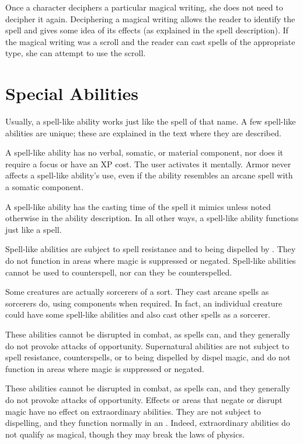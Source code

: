 Once a character deciphers a particular magical writing, she does not need to decipher it again. Deciphering a magical writing allows the reader to identify the spell and gives some idea of its effects (as explained in the spell description). If the magical writing was a scroll and the reader can cast spells of the appropriate type, she can attempt to use
the scroll.

\section{Special Abilities }

 Usually, a spell-like ability works just like the spell of that name. A few spell-like abilities are unique; these are explained in the text where they are described.

A spell-like ability has no verbal, somatic, or material component, nor does it require a focus or have an XP cost. The user activates it mentally. Armor never affects a spell-like ability's use, even if the ability resembles an arcane spell with a somatic component.

A spell-like ability has the casting time of the spell it mimics unless noted otherwise in the ability description. In all other ways, a spell-like ability functions just like a spell.

Spell-like abilities are subject to spell resistance and to being dispelled by . They do not function in areas where magic is suppressed or negated. Spell-like abilities cannot be used to counterspell, nor can they be counterspelled.

Some creatures are actually sorcerers of a sort. They cast arcane spells as sorcerers do, using components when required. In fact, an individual creature could have some spell-like abilities and also cast other spells as a sorcerer.

 These abilities cannot be disrupted in combat, as spells can, and they generally do not provoke attacks of opportunity. Supernatural abilities are not subject to spell resistance, counterspells, or to being dispelled by dispel magic, and do not function in areas where magic is suppressed or negated.

 These abilities cannot be disrupted in combat, as spells can, and they generally do not provoke attacks of opportunity. Effects or areas that negate or disrupt magic have no effect on extraordinary abilities. They are not subject to dispelling, and they function normally in an . Indeed, extraordinary abilities do not qualify as magical, though they may break the laws of physics.

